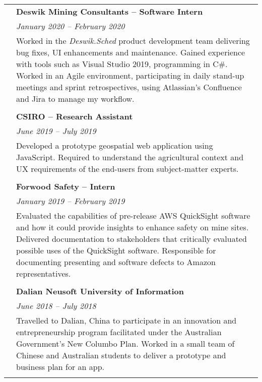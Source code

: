 \documentclass[a4paper]{article}
\begin{document}
\begin{longtable}{r p{13.5cm}}
										\vline & \textbf{Deswik Mining Consultants – Software Intern} \\
										\vline & \textit{January 2020 – February 2020} \\
										\vline & Worked in the \textit{Deswik.Sched} product development team delivering bug fixes, UI enhancements and maintenance. Gained experience with tools such as Visual Studio 2019, programming in C\#. Worked in an Agile environment, participating in daily stand-up meetings and sprint retrospectives, using Atlassian’s Confluence and Jira to manage my workflow. \\ 
										\vline & \\
										
										\vline & \textbf{CSIRO – Research Assistant} \\
										\vline & \textit{June 2019 – July 2019} \\
										\vline & Developed a prototype geospatial web application using JavaScript. Required to understand the agricultural context and UX requirements of the end-users from subject-matter experts. \\
										\vline & \\
										
										\vline & \textbf{Forwood Safety – Intern} \\
										\vline & \textit{January 2019 – February 2019} \\
										\vline & Evaluated the capabilities of pre-release AWS QuickSight software and how it could provide insights to enhance safety on mine sites. Delivered documentation to stakeholders that critically evaluated possible uses of the QuickSight software. Responsible for documenting presenting and software defects to Amazon representatives. \\
										\vline & \\
										
										\vline & \textbf{Dalian Neusoft University of Information} \\
										\vline & \textit{June 2018 – July 2018} \\
										\vline & Travelled to Dalian, China to participate in an innovation and entrepreneurship program facilitated under the Australian Government’s New Columbo Plan. Worked in a small team of Chinese and Australian students to deliver a prototype and business plan for an app. \\
										\vline & \\
										

\end{longtable}
\end{document}
